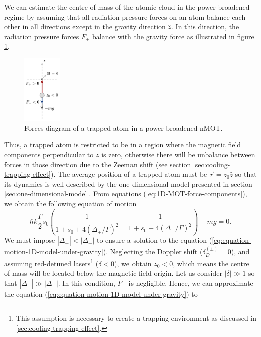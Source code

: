 We can estimate the centre of mass of the atomic cloud in the power-broadened regime by assuming that all radiation pressure forces on an atom balance each other in all directions except in the gravity direction $ \hat{z} $. In this direction, the radiation pressure forces $ F_{\pm} $ balance with the gravity force as illustrated in figure \ref{fig:forces-diagram-trapped-atom-nMOT-power-broadened-regime}.
\begin{figure}[!ht]
    \centering
    \includegraphics[width=0.17\textwidth]{USPSC-img/centre_of_mass_power_broadened_regime.png}
    \caption{Forces diagram of a trapped atom in a power-broadened nMOT.}
    \label{fig:forces-diagram-trapped-atom-nMOT-power-broadened-regime}
    \vspace{-10px}
\end{figure}
Thus, a trapped atom is restricted to be in a region where the magnetic field components perpendicular to $ z $ is zero, otherwise there will be unbalance between forces in those direction due to the Zeeman shift (see section \ref{sec:cooling-trapping-effect}). The average position of a trapped atom must be $ \vec{r} = z_0 \hat{z} $ so that its dynamics is well described by the one-dimensional model presented in section \ref{sec:one-dimensional-model}. From equations (\ref{eq:1D-MOT-force-components}), we obtain the following equation of motion
\begin{equation}
    \hbar k \frac{\Gamma}{2} s_0 \left( \frac{1}{1 + s_0 + 4(\Delta_{+} / \Gamma)^2} - \frac{1}{1 + s_0 + 4(\Delta_{-} / \Gamma)^2}  \right) - mg = 0.
    \label{eq:equation-motion-1D-model-under-gravity}
\end{equation}
We must impose $ |\Delta_{+}| < |\Delta_{-}| $ to ensure a solution to the equation (\ref{eq:equation-motion-1D-model-under-gravity}). Neglecting the Doppler shift ($ \delta_{D}^{(\pm)} = 0 $), and assuming red-detuned lasers\footnote{This assumption is necessary to create a trapping environment as discussed in \ref{sec:cooling-trapping-effect}.} ($ \delta < 0 $), we obtain $ z_0 < 0 $, which means the centre of mass will be located below the magnetic field origin. Let us consider $ |\delta| \gg 1 $ so that $ |\Delta_{+}| \gg |\Delta_{-}| $. In this condition, $ F_{-} $ is negligible. Hence, we can approximate the equation (\ref{eq:equation-motion-1D-model-under-gravity}) to
